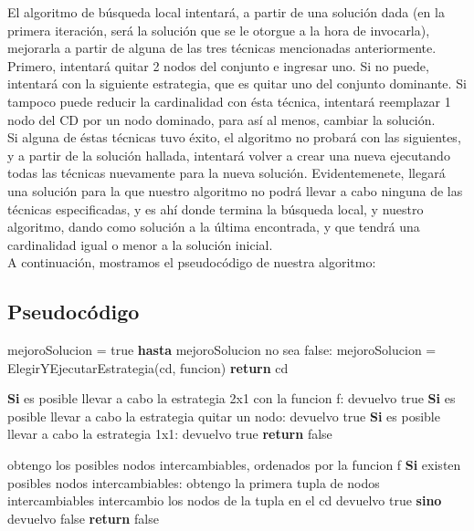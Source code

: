 El algoritmo de búsqueda local intentará, a partir de una solución dada (en la primera iteración, será la solución que se le otorgue a la hora de invocarla), mejorarla a partir de alguna de las tres técnicas mencionadas anteriormente. Primero, intentará quitar 2 nodos del conjunto e ingresar uno. Si no puede, intentará con la siguiente estrategia, que es quitar uno del conjunto dominante. Si tampoco puede reducir la cardinalidad con ésta técnica, intentará reemplazar 1 nodo del CD por un nodo dominado, para así al menos, cambiar la solución. \\
Si alguna de éstas técnicas tuvo éxito, el algoritmo no probará con las siguientes, y a partir de la solución hallada, intentará volver a crear una nueva ejecutando todas las técnicas nuevamente para la nueva solución. Evidentemenete, llegará una solución para la que nuestro algoritmo no podrá llevar a cabo ninguna de las técnicas especificadas, y es ahí donde termina la búsqueda local, y nuestro algoritmo, dando como solución a la última encontrada, y que tendrá una cardinalidad igual o menor a la solución inicial. \\
A continuación, mostramos el pseudocódigo de nuestra algoritmo:  \\

\subsection{Pseudocódigo}
\begin{codebox}
\li mejoroSolucion = true
\li	\textbf{hasta} mejoroSolucion no sea false: \Do
\li		mejoroSolucion = ElegirYEjecutarEstrategia(cd, funcion)
\End
\End
\li	\textbf{return} cd
\end{codebox}

\begin{codebox}
\li		\textbf{Si} es posible llevar a cabo la estrategia 2x1 con la funcion f: \Do
\li			devuelvo true
\End
\li		\textbf{Si} es posible llevar a cabo la estrategia quitar un nodo: \Do
\li			devuelvo true
\End
\li		\textbf{Si} es posible llevar a cabo la estrategia 1x1: \Do
\li			devuelvo true
\End
\li \textbf{return} false
\end{codebox}

\begin{codebox}
\li		obtengo los posibles nodos intercambiables, ordenados por la funcion f
\li		\textbf{Si} existen posibles nodos intercambiables: \Do
\li			obtengo la primera tupla de nodos intercambiables
\li			intercambio los nodos de la tupla en el cd
\li			devuelvo true
\li		\textbf{sino} devuelvo false
\End
\li \textbf{return} false
\end{codebox}


